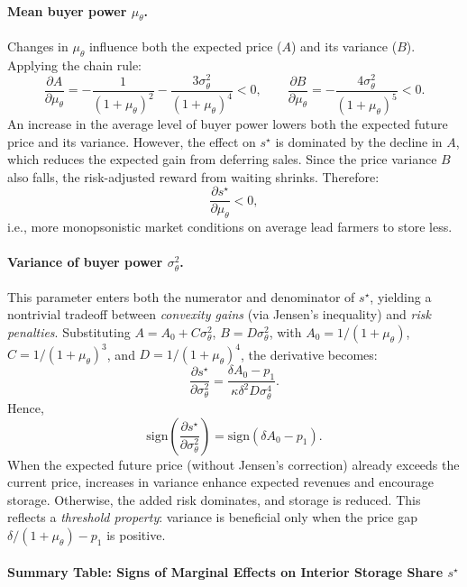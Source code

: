 \paragraph{Mean buyer power \(\mu_\theta\).}
Changes in \(\mu_\theta\) influence both the expected price (\(A\)) and its variance (\(B\)). Applying the chain rule:
$$
\frac{\partial A}{\partial \mu_\theta} = -\frac{1}{(1 + \mu_\theta)^2} - \frac{3\sigma_\theta^2}{(1 + \mu_\theta)^4} < 0,\qquad
\frac{\partial B}{\partial \mu_\theta} = -\frac{4\sigma_\theta^2}{(1 + \mu_\theta)^5} < 0.
$$
An increase in the average level of buyer power lowers both the expected future price and its variance. However, the effect on \(s^{\star}\) is dominated by the decline in \(A\), which reduces the expected gain from deferring sales. Since the price variance \(B\) also falls, the risk-adjusted reward from waiting shrinks. Therefore:
$$
\frac{\partial s^{\star}}{\partial \mu_\theta} < 0,
$$
i.e., more monopsonistic market conditions on average lead farmers to store less.

\paragraph{Variance of buyer power \(\sigma_\theta^2\).}
This parameter enters both the numerator and denominator of \(s^{\star}\), yielding a nontrivial tradeoff between \textit{convexity gains} (via Jensen’s inequality) and \textit{risk penalties}. Substituting \(A = A_0 + C\sigma_\theta^2\), \(B = D\sigma_\theta^2\), with \(A_0 = 1/(1 + \mu_\theta)\), \(C = 1/(1 + \mu_\theta)^3\), and \(D = 1/(1 + \mu_\theta)^4\), the derivative becomes:
$$
\frac{\partial s^{\star}}{\partial \sigma_\theta^2}
=
\frac{\delta A_0 - p_1}{\kappa \delta^2 D \sigma_\theta^4}.
$$
Hence,
$$
\text{sign}\left( \frac{\partial s^{\star}}{\partial \sigma_\theta^2} \right)
= \text{sign}\left( \delta A_0 - p_1 \right).
$$
When the expected future price (without Jensen's correction) already exceeds the current price, increases in variance enhance expected revenues and encourage storage. Otherwise, the added risk dominates, and storage is reduced. This reflects a \textit{threshold property}: variance is beneficial only when the price gap \(\delta/(1 + \mu_\theta) - p_1\) is positive.

\paragraph{Summary Table: Signs of Marginal Effects on Interior Storage Share \(s^{\star}\)}

